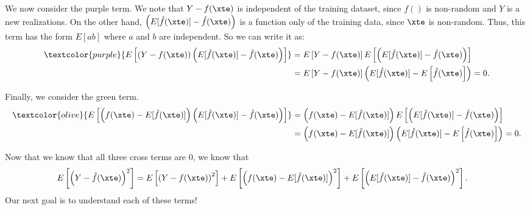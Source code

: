 We now consider the purple term. We note that $Y-f(\xte)$ is independent of the training dataset, since $f()$ is non-random and $Y$ is a new realizations. On the other hand, $\left(E[\hat{f}(\xte)] -  \hat{f}(\xte)\right)$ is a function only of the training data, since $\xte$ is non-random. Thus, this term has the form $E[ab]$ where $a$ and $b$ are independent. So we can write it as: 
\begin{align*}
 \textcolor{purple}{E\left[\left(Y -f(\xte)\right) \left(E[\hat{f}(\xte)] -  \hat{f}(\xte)\right)\right]} &= 	E\left[ Y -f(\xte)\right] E\left[\left(E[\hat{f}(\xte)] -  \hat{f}(\xte)\right)\right] \\
 &= E\left[ Y -f(\xte)\right] \left(E[\hat{f}(\xte)] -   E\left[\hat{f}(\xte)\right] \right) = 0. \\
\end{align*}

Finally, we consider the green term. 
\begin{align*}
\textcolor{olive}{E\left[\left(f(\xte) - E[\hat{f}(\xte)]\right) \left(E[\hat{f}(\xte)] -  \hat{f}(\xte)\right)\right]} &= \left(f(\xte) - E[\hat{f}(\xte)]\right) E\left[ \left(E[\hat{f}(\xte)] -  \hat{f}(\xte)\right)\right] \\
&= \left(f(\xte) - E[\hat{f}(\xte)]\right) \left(E[\hat{f}(\xte)] -   E\left[ \hat{f}(\xte) \right]\right) = 0. 
\end{align*}

Now that we know that all three cross terms are $0$, we know that 
\begin{align*}
 E\left[\left(Y - \hat{f}(\xte)\right)^2 \right] &= E\left[\left(Y -f(\xte)\right)^2\right] + E\left[\left(f(\xte) - E[\hat{f}(\xte)]\right)^2\right] + E\left[\left(E[\hat{f}(\xte)] -  \hat{f}(\xte)\right)^2\right]. 
\end{align*}
Our next goal is to understand each of these terms! 

